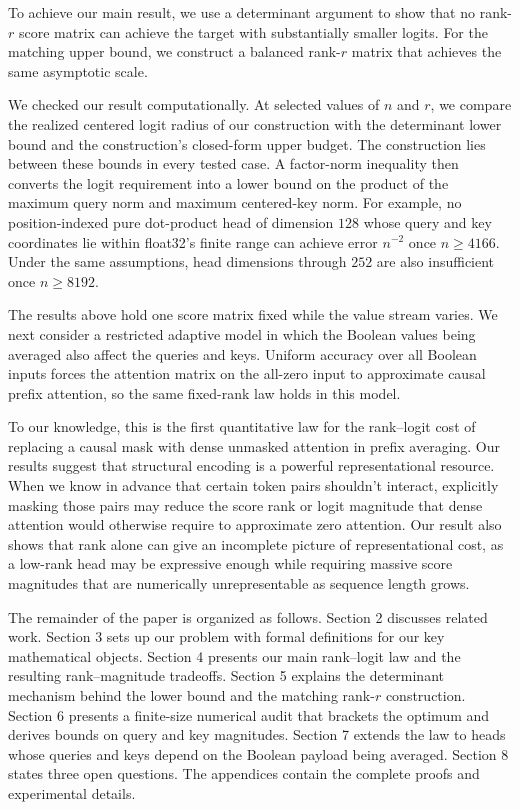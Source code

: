 \documentclass[10pt]{article} %
\theoremstyle{definition}
\begin{document}
To achieve our main result, we use a determinant argument to show that no
rank-\(r\) score matrix can achieve the target with substantially smaller
logits. For the matching upper bound, we construct a balanced rank-\(r\)
matrix that achieves the same asymptotic scale.

We checked our result computationally. At selected values of \(n\) and \(r\),
we compare the realized centered logit radius of our construction with the
determinant lower bound and the construction's closed-form upper
budget. The construction lies between these bounds in every tested case. A
factor-norm inequality then converts the logit requirement into a lower bound
on the product of the maximum query norm and maximum centered-key norm. For
example, no position-indexed pure dot-product head of dimension \(128\) whose
query and key coordinates lie within
float32's finite range can achieve error \(n^{-2}\) once \(n\ge4166\). Under
the same assumptions, head dimensions through \(252\) are also insufficient
once \(n\ge8192\).

The results above hold one score matrix fixed while the value stream varies.
We next consider a restricted adaptive model in which the Boolean values being
averaged also affect the queries and keys. Uniform accuracy over all Boolean
inputs forces the attention matrix on the all-zero input to approximate causal
prefix attention, so the same fixed-rank law holds in this model.

To our knowledge, this is the first quantitative law for the rank--logit cost
of replacing a causal mask with dense unmasked attention in prefix averaging.
Our results suggest that structural encoding is a powerful
representational resource. When we know in advance that certain token pairs
shouldn't interact, explicitly masking those pairs may reduce the score rank
or logit magnitude that dense attention would otherwise require to approximate
zero attention. Our result also shows that rank alone can give an incomplete
picture of representational cost, as a low-rank head may be expressive enough
while requiring massive score magnitudes that are numerically unrepresentable
as sequence length grows.

The remainder of the paper is organized as follows. Section 2 discusses
related work. Section 3 sets up our problem with formal definitions for our
key mathematical objects. Section 4 presents our main rank--logit law and the
resulting rank--magnitude tradeoffs. Section 5 explains the determinant
mechanism behind the lower bound and the matching rank-\(r\) construction.
Section 6 presents a finite-size numerical audit that brackets the optimum and
derives bounds on query and key magnitudes. Section 7 extends the law to heads whose
queries and keys depend on the Boolean payload being averaged. Section 8
states three open questions. The appendices contain the complete proofs and
experimental details.
\end{document}
